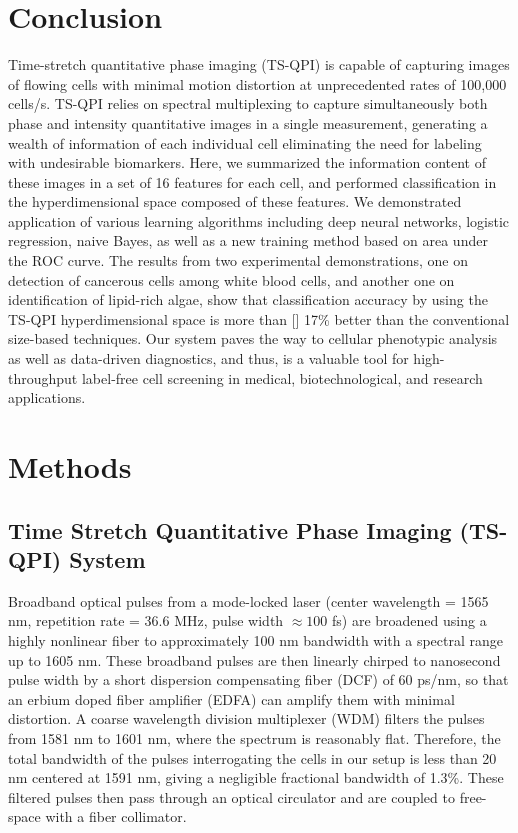 \documentclass[aps,pra,reprint,longbibliography,superscriptaddress]{revtex4-1}
\begin{document}
\section{Conclusion}

Time-stretch quantitative phase imaging (TS-QPI) is capable of capturing images of flowing cells with minimal motion distortion at unprecedented rates of 100,000 cells/s. TS-QPI relies on spectral multiplexing to capture simultaneously both phase and intensity quantitative images in a single measurement, generating a wealth of information of each individual cell eliminating the need for labeling with undesirable biomarkers. Here, we summarized the information content of these images in a set of 16 features for each cell, and performed classification in the hyperdimensional space composed of these features. We demonstrated application of various learning algorithms including deep neural networks, logistic regression, naive Bayes, as well as a new training method based on area under the ROC curve. The results from two experimental demonstrations, one on detection of cancerous cells among white blood cells, and another one on identification of lipid-rich algae, show that classification accuracy by using the TS-QPI hyperdimensional space is more than [] 17\% better than the conventional size-based techniques. Our system paves the way to cellular phenotypic analysis as well as data-driven diagnostics, and thus, is a valuable tool for high-throughput label-free cell screening in medical, biotechnological, and research applications.

\section{\label{scn:Methods} Methods}

\subsection{Time Stretch Quantitative Phase Imaging (TS-QPI) System}

Broadband optical pulses from a mode-locked laser (center wavelength = 1565 nm, repetition rate = 36.6 MHz, pulse width $\approx100$ fs) are broadened using a highly nonlinear fiber to approximately 100 nm bandwidth with a spectral range up to 1605 nm. These broadband pulses are then linearly chirped to nanosecond pulse width by a short dispersion compensating fiber (DCF) of 60 ps/nm, so that an erbium doped fiber amplifier (EDFA) can amplify them with minimal distortion. A coarse wavelength division multiplexer (WDM) filters the pulses from 1581 nm to 1601 nm, where the spectrum is reasonably flat. Therefore, the total bandwidth of the pulses interrogating the cells in our setup is less than 20 nm centered at 1591 nm, giving a negligible fractional bandwidth of 1.3\%. These filtered pulses then pass through an optical circulator and are coupled to free-space with a fiber collimator.
\end{document}
